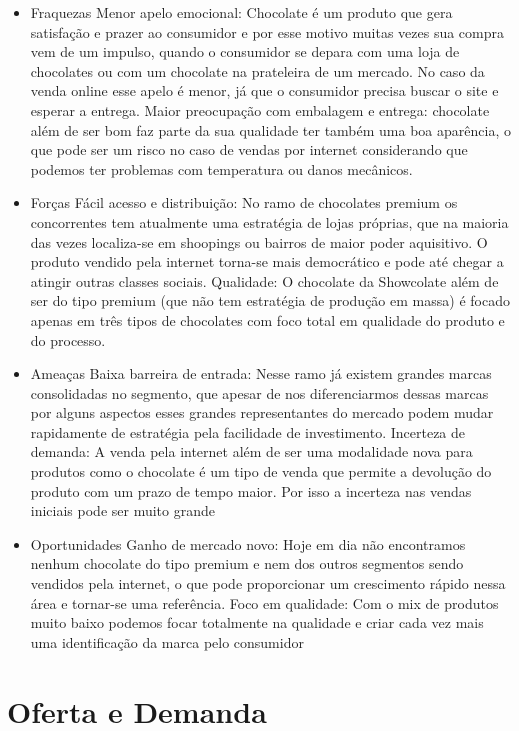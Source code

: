 \documentclass[
	12pt,				%
	openright,			%
	oneside,			%
	a4paper,			%
	english,			%
	french,				%
	spanish,			%
	brazil				%
	]{abntex2}
\begin{document}
\begin{itemize}
\item Fraquezas
\subitem Menor apelo emocional: Chocolate é um produto que gera satisfação e prazer ao consumidor e por esse motivo muitas vezes sua compra vem de um impulso, quando o consumidor se depara com uma loja de chocolates ou com um chocolate na prateleira de um mercado. No caso da venda online esse apelo é menor, já que o consumidor precisa buscar o site e esperar a entrega.
\subitem Maior preocupação com embalagem e entrega: chocolate além de ser bom faz parte da sua qualidade ter também uma boa aparência, o que pode ser um risco no caso de vendas por internet considerando que podemos ter problemas com temperatura ou danos mecânicos.
\item Forças
\subitem Fácil acesso e distribuição: No ramo de chocolates premium os concorrentes tem atualmente uma estratégia de lojas próprias, que na maioria das vezes localiza-se em shoopings ou bairros de maior poder aquisitivo. O produto vendido pela internet torna-se mais democrático e pode até chegar a atingir outras classes sociais.
\subitem Qualidade: O chocolate da Showcolate além de ser do tipo premium (que não tem estratégia de produção em massa) é focado apenas em três tipos de chocolates com foco total em qualidade do produto e do processo.
\item Ameaças
\subitem Baixa barreira de entrada: Nesse ramo já existem grandes marcas consolidadas no segmento, que apesar de nos diferenciarmos dessas marcas por alguns aspectos esses grandes representantes do mercado podem mudar rapidamente de estratégia pela facilidade de investimento.
\subitem Incerteza de demanda:  A venda pela internet além de ser uma modalidade nova para produtos como o chocolate é um tipo de venda que permite a devolução do produto com um prazo de tempo maior. Por isso a incerteza nas vendas iniciais pode ser muito grande
\item Oportunidades
\subitem Ganho de mercado novo: Hoje em dia não encontramos nenhum chocolate do tipo premium e nem dos outros segmentos sendo vendidos pela internet, o que pode proporcionar um crescimento rápido nessa área e tornar-se uma referência.
\subitem Foco em qualidade: Com o mix de produtos muito baixo podemos focar totalmente na qualidade e criar cada vez mais uma identificação da marca pelo consumidor 
\end{itemize}

\chapter{Oferta e Demanda}
\end{document}
